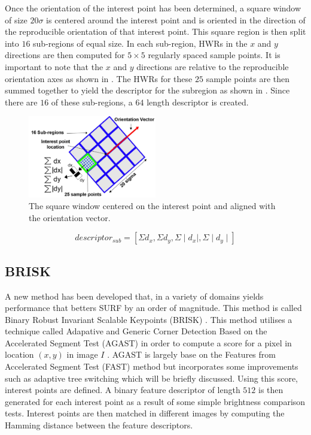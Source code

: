 \documentclass{report}
\begin{document}
Once the orientation of the interest point has been determined, a square window of size $20\sigma$ is centered around the interest point and is oriented in the direction of the reproducible orientation of that interest point. This square region is then split into $16$ sub-regions of equal size. In each sub-region, HWRs in the $x$ and $y$ directions are then computed for $5 \times 5$ regularly spaced sample points. It is important to note that the $x$ and $y$ directions are relative to the reproducible orientation axes as shown in  \cite{Evans2009}. The HWRs for these $25$ sample points are then summed together to yield the descriptor for the subregion as shown in . Since there are $16$ of these sub-regions, a $64$ length descriptor is created.\\

\begin{figure}[h!] 
  \centering
    \includegraphics[width=0.5\textwidth]{../Drawings/methods/SURF2D_Descriptor.jpg}
    \caption{The square window centered on the interest point and aligned with the orientation vector.}
    \label{fig:reproducibleAxes}
\end{figure}

\begin{equation}
descriptor_{sub} = [\Sigma d_x, \Sigma d_y,  \Sigma \mid d_x \mid , \Sigma \mid d_y \mid] 
\label{eqn:descriptorSub}
\end{equation} 



\subsection{BRISK}
\label{sec:brisk}
A new method has been developed that, in a variety of domains yields performance that betters SURF by an order of magnitude. This method is called Binary Robust Invariant Scalable Keypoints (BRISK) \cite{Leutenegger2011}. This method utilises a technique called Adapative and Generic Corner Detection Based on the Accelerated Segment Test (AGAST) in order to compute a score for a pixel in location $(x,y)$ in image $I$ \cite{Mair2010}. AGAST is largely base on the Features from Accelerated Segment Test (FAST) \cite{Rosten2006} method but incorporates some improvements such as adaptive tree switching which will be briefly discussed. Using this score, interest points are defined. A binary feature descriptor of length $512$ is then generated for each interest point as a result of some simple brightness comparison tests. Interest points are then matched in different images by computing the Hamming distance between the feature descriptors. \\
\end{document}

